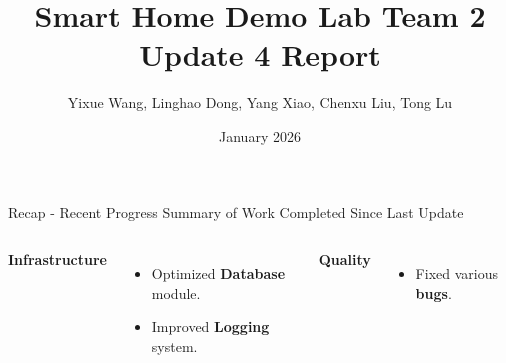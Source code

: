 \documentclass[aspectratio=169, 10pt, xcolor=table]{beamer}
\title[Smart Home Demo Lab Team 2 Update 4 Report]{Smart Home Demo Lab Team 2 Update 4 Report}
\author[Team 2]{Yixue Wang, Linghao Dong, Yang Xiao, Chenxu Liu, Tong Lu}
\date{January 2026}
\begin{document}
\begin{frame}
    \titlepage
\end{frame}


\begin{frame}{Recap - Recent Progress}
    {Summary of Work Completed Since Last Update}
    
    \begin{columns}[c]

            \pause
            \textbf{Infrastructure}
            \vspace{0.3em}
            \begin{itemize}
                \item Optimized \textbf{Database} module.
                \item Improved \textbf{Logging} system.
            \end{itemize}
            
            \vspace{0.5em}
            \textbf{Quality}
            \vspace{0.3em}
            \begin{itemize}
                \item Fixed various \textbf{bugs}.
            \end{itemize}
    \end{columns}
\end{frame}
\end{document}
